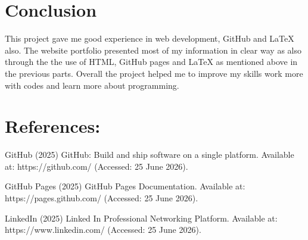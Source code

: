 \documentclass[12pt]{article}
\begin{document}
 \section*{Conclusion}

This project gave me good experience in web development, GitHub and LaTeX also. The website portfolio presented most of my information in clear way as also through the the use of HTML, GitHub pages and LaTeX as mentioned above in the previous parts. Overall the project helped me to improve my skills work more with codes and learn more about programming.
\newpage
\section*{References:}
GitHub (2025) GitHub: Build and ship software on a single platform. Available at:  https://github.com/ (Accessed: 25 June 2026).

\vspace{0.2cm}

GitHub Pages (2025) GitHub Pages Documentation. Available at:  https://pages.github.com/ (Accessed: 25 June 2026).

\vspace{0.2cm}

LinkedIn (2025) Linked In Professional Networking Platform. Available at:  https://www.linkedin.com/ (Accessed: 25 June 2026).






\end{document}
